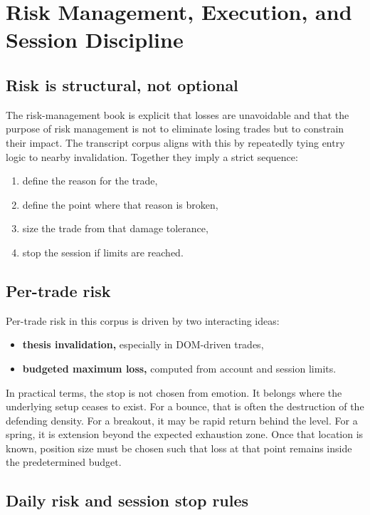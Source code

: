 \section{Risk Management, Execution, and Session Discipline}

\subsection{Risk is structural, not optional}

The risk-management book is explicit that losses are unavoidable and that the purpose of risk management is not to eliminate losing trades but to constrain their impact. The transcript corpus aligns with this by repeatedly tying entry logic to nearby invalidation. Together they imply a strict sequence:

\begin{enumerate}
\item define the reason for the trade,
\item define the point where that reason is broken,
\item size the trade from that damage tolerance,
\item stop the session if limits are reached.
\end{enumerate}

\subsection{Per-trade risk}

Per-trade risk in this corpus is driven by two interacting ideas:

\begin{itemize}
\item \textbf{thesis invalidation,} especially in DOM-driven trades,
\item \textbf{budgeted maximum loss,} computed from account and session limits.
\end{itemize}

In practical terms, the stop is not chosen from emotion. It belongs where the underlying setup ceases to exist. For a bounce, that is often the destruction of the defending density. For a breakout, it may be rapid return behind the level. For a spring, it is extension beyond the expected exhaustion zone. Once that location is known, position size must be chosen such that loss at that point remains inside the predetermined budget.

\subsection{Daily risk and session stop rules}

